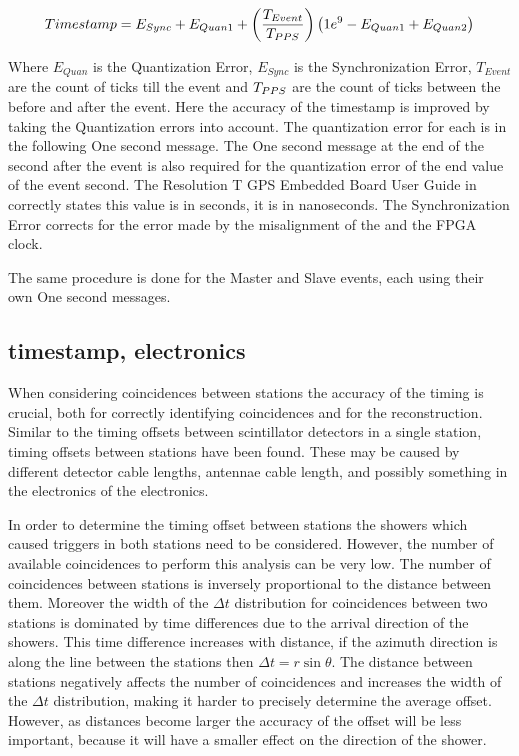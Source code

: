 \begin{equation}
\label{eq:timestamp}
    Timestamp = E_{Sync} + E_{Quan1} + \left(\frac{T_{Event}}{T_{\pps}}\right)
                 \left(1e^9 - E_{Quan1} + E_{Quan2}\right)
\end{equation}

Where $E_{Quan}$ is the Quantization Error, $E_{Sync}$ is the Synchronization Error, $T_{Event}$ are the count of ticks till the event and $T_{\pps}$ are the count of ticks between the \pps before and after the event. Here the accuracy of the timestamp is improved by taking the Quantization errors into account. The quantization error for each \pps is in the following One second message. The One second message at the end of the second after the event is also required for the quantization error of the end value of the event second. The Resolution T GPS Embedded Board User Guide in correctly states this value is in seconds, it is in nanoseconds. The Synchronization Error corrects for the error made by the misalignment of the \pps and the FPGA clock.

The same procedure is done for the Master and Slave events, each using their own One second messages.


\subsection{\gps timestamp, electronics}

When considering coincidences between stations the accuracy of the timing is crucial, both for correctly identifying coincidences and for the reconstruction. Similar to the timing offsets between scintillator detectors in a single station, timing offsets between stations have been found. These may be caused by different detector cable lengths, \gps antennae cable length, and possibly something in the electronics of the \hisparc electronics.

In order to determine the timing offset between stations the showers which caused triggers in both stations need to be considered. However, the number of available coincidences to perform this analysis can be very low. The number of coincidences between stations is inversely proportional to the distance between them. Moreover the width of the $\Delta t$ distribution for coincidences between two stations is dominated by time differences due to the arrival direction of the showers. This time difference increases with distance, if the azimuth direction is along the line between the stations then $\Delta t = r \sin{\theta}$. The distance between stations negatively affects the number of coincidences and increases the width of the $\Delta t$ distribution, making it harder to precisely determine the average offset. However, as distances become larger the accuracy of the offset will be less important, because it will have a smaller effect on the direction of the shower.

